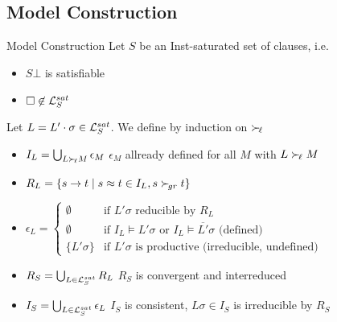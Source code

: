 \documentclass[%
handout,
]{beamer}
\begin{document}
\subsection{Model Construction}
\begin{frame}[allowframebreaks]{Model Construction}
    Let $S$ be an Inst-saturated set of clauses, i.e.
    \begin{itemize}
        \item $S\bot$ is satisfiable
        \item $\square\not\in\mathcal{L}_S^{sat}$

\end{itemize}

\vspace{1.4em}
    Let $L = L'\cdot\sigma \in\mathcal{L}_S^{sat}$.
    We define by induction on $\mathrel\succ_{\!\ell}$
        \begin{itemize}
            \item $I_L = \bigcup_{L\mathrel\succ_{\!\ell} M}\epsilon_M$
            \hfill $\epsilon_M$ allready defined for all $M$ with $L\mathrel\succ_{\!\ell} M$

            \item $R_L = \{ s \to t \mid s\approx t\in I_L, s\mathrel\succ_{\!gr} t \}$

                \item $\epsilon_L = \left\{
                    \begin{array}{cl}
                        \emptyset &\text{if }
                        L'\sigma\text{ reducible by }R_L
                        \\
                        \emptyset &\text{if }
                        I_L\vDash L'\sigma
                        \text{ or }
                        I_L\vDash \overline{L'}\sigma
                        \text{ (defined)}
                        \\
                        \{ L'\sigma \}
                        &\text{if }L'\sigma \text{ is productive (irreducible, undefined)}
                    \end{array}
                \right.$

                \framebreak
            \item
            $R_S = \bigcup_{L\in\mathcal{L}_S^{sat}} R_L$
            \hfill
            $R_S$ is convergent and interreduced

            \vspace{0.7em}
            \item
            $I_S = \bigcup_{L\in\mathcal{L}_S^{sat}} \epsilon_L$
            \hfill
            $I_S$ is consistent,
            $L\sigma\in I_S$ is irreducible by $R_S$
        \end{itemize}


\end{frame}
\end{document}

